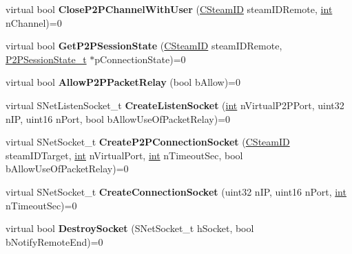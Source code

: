 \begin{DoxyCompactItemize}
\item 
\hypertarget{classISteamNetworking_a5e17571ca6b0a4d99c93d0f55293acb5}{}virtual bool {\bfseries Close\+P2\+P\+Channel\+With\+User} (\hyperlink{classCSteamID}{C\+Steam\+I\+D} steam\+I\+D\+Remote, \hyperlink{SDL__thread_8h_a6a64f9be4433e4de6e2f2f548cf3c08e}{int} n\+Channel)=0\label{classISteamNetworking_a5e17571ca6b0a4d99c93d0f55293acb5}

\item 
\hypertarget{classISteamNetworking_af78aecf5a699774a72f1440b1b32a7ad}{}virtual bool {\bfseries Get\+P2\+P\+Session\+State} (\hyperlink{classCSteamID}{C\+Steam\+I\+D} steam\+I\+D\+Remote, \hyperlink{structP2PSessionState__t}{P2\+P\+Session\+State\+\_\+t} $\ast$p\+Connection\+State)=0\label{classISteamNetworking_af78aecf5a699774a72f1440b1b32a7ad}

\item 
\hypertarget{classISteamNetworking_a374e6634e1561faada8a7e3d057b2803}{}virtual bool {\bfseries Allow\+P2\+P\+Packet\+Relay} (bool b\+Allow)=0\label{classISteamNetworking_a374e6634e1561faada8a7e3d057b2803}

\item 
\hypertarget{classISteamNetworking_abf79b7d6e2a497f1b72d25df40cc5f4c}{}virtual S\+Net\+Listen\+Socket\+\_\+t {\bfseries Create\+Listen\+Socket} (\hyperlink{SDL__thread_8h_a6a64f9be4433e4de6e2f2f548cf3c08e}{int} n\+Virtual\+P2\+P\+Port, uint32 n\+I\+P, uint16 n\+Port, bool b\+Allow\+Use\+Of\+Packet\+Relay)=0\label{classISteamNetworking_abf79b7d6e2a497f1b72d25df40cc5f4c}

\item 
\hypertarget{classISteamNetworking_a6fd47853762ab39910616544cedc13e4}{}virtual S\+Net\+Socket\+\_\+t {\bfseries Create\+P2\+P\+Connection\+Socket} (\hyperlink{classCSteamID}{C\+Steam\+I\+D} steam\+I\+D\+Target, \hyperlink{SDL__thread_8h_a6a64f9be4433e4de6e2f2f548cf3c08e}{int} n\+Virtual\+Port, \hyperlink{SDL__thread_8h_a6a64f9be4433e4de6e2f2f548cf3c08e}{int} n\+Timeout\+Sec, bool b\+Allow\+Use\+Of\+Packet\+Relay)=0\label{classISteamNetworking_a6fd47853762ab39910616544cedc13e4}

\item 
\hypertarget{classISteamNetworking_a5a9ce6ba68b44aed70a7221ef97a0783}{}virtual S\+Net\+Socket\+\_\+t {\bfseries Create\+Connection\+Socket} (uint32 n\+I\+P, uint16 n\+Port, \hyperlink{SDL__thread_8h_a6a64f9be4433e4de6e2f2f548cf3c08e}{int} n\+Timeout\+Sec)=0\label{classISteamNetworking_a5a9ce6ba68b44aed70a7221ef97a0783}

\item 
\hypertarget{classISteamNetworking_abdbfec12b11db46d7b61a88c8df81bd5}{}virtual bool {\bfseries Destroy\+Socket} (S\+Net\+Socket\+\_\+t h\+Socket, bool b\+Notify\+Remote\+End)=0\label{classISteamNetworking_abdbfec12b11db46d7b61a88c8df81bd5}


\end{DoxyCompactItemize}

